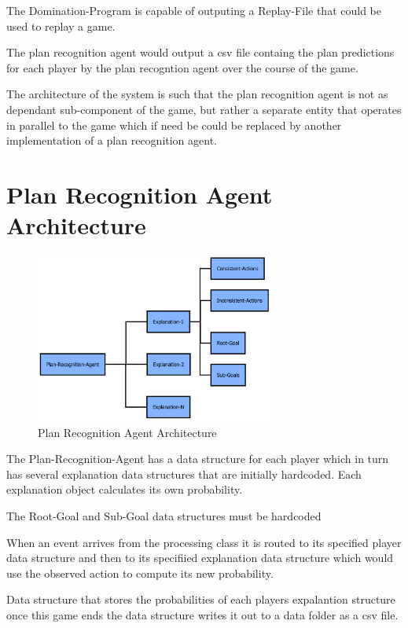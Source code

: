 \documentclass[parskip]{cs4rep}
\begin{document}
The Domination-Program is capable of outputing a Replay-File that could be used to replay a game.

The plan recognition agent would output a csv file containg the plan predictions for each player by the plan recogntion agent over the course of the game.

The architecture of the system is such that the plan recognition agent is not as dependant sub-component of the game, but rather a separate entity that operates in parallel to the game which if need be could be replaced by another implementation of a plan recognition agent.

\newpage

\section{Plan Recognition Agent Architecture}

\begin{figure}[h]
\centerline{
\includegraphics[width=0.7\textwidth]{images/plan-recognition-agent-architecture}
}
\caption{Plan Recognition Agent Architecture}
\end{figure} 

The Plan-Recognition-Agent has a data structure for each player which in turn has several explanation data structures that are initially hardcoded. Each explanation object calculates its own probability.

The Root-Goal and Sub-Goal data structures must be hardcoded 

When an event arrives from the processing class it is routed to its specified player data structure and then to its specifiied explanation data structure which would use the observed action to compute its new probability.

Data structure that stores the probabilities of each players expalantion structure once this game ends the data structure writes it out to a data folder as a csv file.
\end{document}
